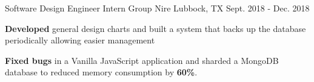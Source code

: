 
\begin{cventries}
  \cventry
    {Software Design Engineer Intern} %
    {Group Nire} %
    {Lubbock, TX} %
    {Sept. 2018 - Dec. 2018} %
    {
      \begin{cvitems} %
        \item { \textbf{Developed} general design charts and built a system that backs up the database periodically allowing easier management}
        \item { \textbf{Fixed bugs} in a Vanilla JavaScript application and sharded a MongoDB database to reduced memory consumption by \textbf{60\%}.}
      \end{cvitems}
    }
   
\end{cventries}
